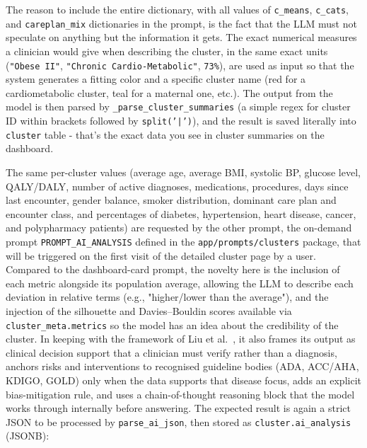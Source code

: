 The reason to include the entire dictionary, with all values of \texttt{c\_means}, \texttt{c\_cats}, and \texttt{careplan\_mix} dictionaries in the prompt, is the fact that the LLM must not speculate on anything but the information it gets. The exact numerical measures a clinician would give when describing the cluster, in the same exact units (\texttt{"Obese II"}, \texttt{"Chronic Cardio-Metabolic"}, \texttt{73\%}), are used as input so that the system generates a fitting color and a specific cluster name (red for a cardiometabolic cluster, teal for a maternal one, etc.). The output from the model is then parsed by \texttt{\_parse\_cluster\_summaries} (a simple regex for cluster ID within brackets followed by \texttt{split('|')}), and the result is saved literally into \texttt{cluster} table - that's the exact data you see in cluster summaries on the dashboard.

The same per-cluster values (average age, average BMI, systolic BP, glucose level, QALY/DALY, number of active diagnoses, medications, procedures, days since last encounter, gender balance, smoker distribution, dominant care plan and encounter class, and percentages of diabetes, hypertension, heart disease, cancer, and polypharmacy patients) are requested by the other prompt, the on-demand prompt \texttt{PROMPT\_AI\_ANALYSIS} defined in the \texttt{app/prompts/clusters} package, that will be triggered on the first visit of the detailed cluster page by a user. Compared to the dashboard-card prompt, the novelty here is the inclusion of each metric alongside its population average, allowing the LLM to describe each deviation in relative terms (e.g., "higher/lower than the average"), and the injection of the silhouette and Davies--Bouldin scores available via \texttt{cluster\_meta.metrics} so the model has an idea about the credibility of the cluster. In keeping with the framework of Liu et al.~\cite{liu2025}, it also frames its output as clinical decision support that a clinician must verify rather than a diagnosis, anchors risks and interventions to recognised guideline bodies (ADA, ACC/AHA, KDIGO, GOLD) only when the data supports that disease focus, adds an explicit bias-mitigation rule, and uses a chain-of-thought reasoning block that the model works through internally before answering. The expected result is again a strict JSON to be processed by \texttt{parse\_ai\_json}, then stored as \texttt{cluster.ai\_analysis} (JSONB):

